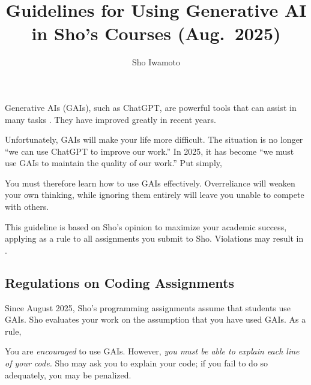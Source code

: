 \documentclass[11pt,pdfa,lastpage,minititle]{MishoNote}
\title{Guidelines for Using Generative AI in Sho's Courses (Aug.~2025)}
\author{Sho Iwamoto}
\begin{document}
\maketitle
Generative AIs (GAIs), such as ChatGPT, are powerful tools that can assist in many tasks%
%
.
They have improved greatly in recent years.


Unfortunately, GAIs will make your life more difficult.
The situation is no longer ``we can use ChatGPT to improve our work.'' In 2025, it has become ``we must use GAIs to maintain the quality of our work.''
Put simply, 

You must therefore learn how to use GAIs effectively. Overreliance will weaken your own thinking, while ignoring them entirely will leave you unable to compete with others.

This guideline is based on Sho's opinion to maximize your academic success, applying as a rule to all assignments you submit to Sho.
Violations may result in .


\subsection*{Regulations on Coding Assignments}
Since August 2025, Sho's programming assignments assume that students use GAIs. Sho evaluates your work on the assumption that you have used GAIs. As a rule,
\begin{miniitemize}
\item You are \emph{encouraged} to use GAIs. However, \emph{you must be able to explain each line of your code.}
      Sho may ask you to explain your code; if you fail to do so adequately, you may be penalized.
\end{miniitemize}
\end{document}
